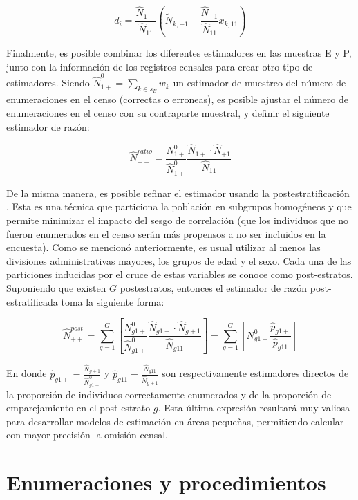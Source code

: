 \documentclass[
  12pt,
]{book}
\begin{document}
\[
d_i = \frac{\hat{N}_{1+}}{\hat{N}_{11}} 
\left(\tilde{N}_{k, +1} - \frac{\hat{N}_{+1}}{\hat{N}_{11}}x_{k, 11}\right)  
\]

Finalmente, es posible combinar los diferentes estimadores en las muestras E y P, junto con la información de los registros censales para crear otro tipo de estimadores. Siendo \(\hat{N}_{1+}^0 = \sum_{k \in s_E}w_k\) un estimador de muestreo del número de enumeraciones en el censo (correctas o erroneas), es posible ajustar el número de enumeraciones en el censo con su contraparte muestral, y definir el siguiente estimador de razón:

\[
\hat{N}_{++}^{ratio} = \frac{N_{1+}^0}{\hat{N}_{1+}^0} \frac{\hat{N}_{1+} \cdot \hat{N}_{+1}}{\hat{N}_{11}}
\]

De la misma manera, es posible refinar el estimador usando la postestratificación \citep{Gutierrez_2016}. Esta es una técnica que particiona la población en subgrupos homogéneos y que permite minimizar el impacto del sesgo de correlación (que los individuos que no fueron enumerados en el censo serán más propensos a no ser incluidos en la encuesta). Como se mencionó anteriormente, es usual utilizar al menos las divisiones administrativas mayores, los grupos de edad y el sexo. Cada una de las particiones inducidas por el cruce de estas variables se conoce como post-estratos. Suponiendo que existen \(G\) postestratos, entonces el estimador de razón post-estratificada toma la siguiente forma:

\[
\hat{N}_{++}^{post} = \sum_{g=1}^G \left[ \frac{N_{g1+}^0}{\hat{N}_{g1+}^0} \frac{\hat{N}_{g1+} \cdot \hat{N}_{g+1}}{\hat{N}_{g11}} \right] =
\sum_{g=1}^G \left[N_{g1+}^0 \frac{\hat{p}_{g1+}}{\hat{p}_{g11}}  \right]
\]

En donde \(\hat{p}_{g1+} = \frac{\hat{N}_{g+1}}{\hat{N}_{g1+}^0}\) y \(\hat{p}_{g11} = \frac{\hat{N}_{g11}}{\hat{N}_{g+1}}\) son respectivamente estimadores directos de la proporción de individuos correctamente enumerados y de la proporción de emparejamiento en el post-estrato \(g\). Esta última expresión resultará muy valiosa para desarrollar modelos de estimación en áreas pequeñas, permitiendo calcular con mayor precisión la omisión censal.

\hypertarget{enumeraciones-y-procedimientos}{%
\chapter{Enumeraciones y procedimientos}\label{enumeraciones-y-procedimientos}}
\end{document}

